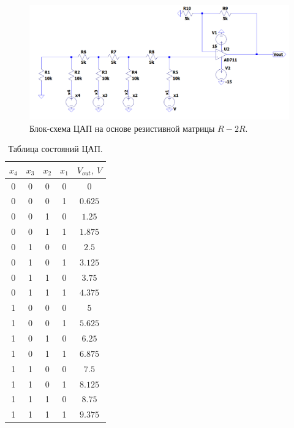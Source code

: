 \documentclass[12pt]{article}
\begin{document}
\begin{figure}[H]
    \centering
    \includegraphics[width=\textwidth]{dac_scheme.png}
    \caption{Блок-схема ЦАП на основе резистивной матрицы $R-2R$.}
    \label{fig:dac_scheme}
\end{figure}

\begin{table}[H]
    \centering
    \begin{tabular}{c | c | c | c | c} 
        $x_4$ & $x_3$ & $x_2$ & $x_1$ & $V_{out}, \ V$ \\  
        \hline
        0 & 0 & 0 & 0 & $0$ \\ 
        \hline
        0 & 0 & 0 & 1 & $0.625$ \\ 
        \hline
        0 & 0 & 1 & 0 & $1.25$ \\ 
        \hline
        0 & 0 & 1 & 1 & $1.875$ \\ 
        \hline
        0 & 1 & 0 & 0 & $2.5$ \\ 
        \hline
        0 & 1 & 0 & 1 & $3.125$ \\ 
        \hline
        0 & 1 & 1 & 0 & $3.75$ \\ 
        \hline
        0 & 1 & 1 & 1 & $4.375$ \\ 
        \hline
        1 & 0 & 0 & 0 & $5$ \\ 
        \hline
        1 & 0 & 0 & 1 & $5.625$ \\ 
        \hline
        1 & 0 & 1 & 0 & $6.25$ \\ 
        \hline
        1 & 0 & 1 & 1 & $6.875$ \\ 
        \hline
        1 & 1 & 0 & 0 & $7.5$ \\ 
        \hline
        1 & 1 & 0 & 1 & $8.125$ \\ 
        \hline
        1 & 1 & 1 & 0 & $8.75$ \\ 
        \hline
        1 & 1 & 1 & 1 & $9.375$ \\ 
    \end{tabular}
    \caption{Таблица состояний ЦАП.}
    \label{table:1}
\end{table}
\end{document}
